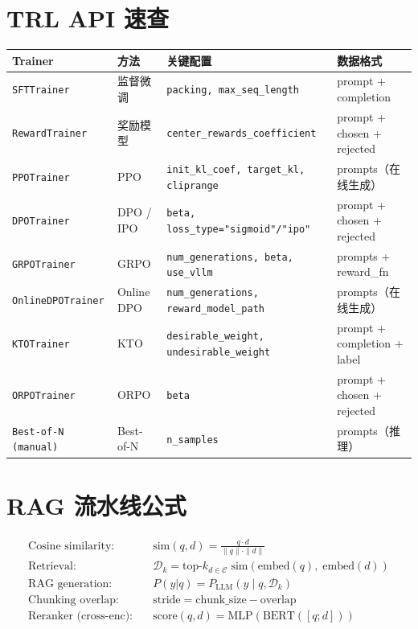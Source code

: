 \section{TRL API 速查}
\label{trl-api-quick-reference}

\noindent\begin{tabularx}{\linewidth}{@{}l Z{0.3} Z{1.58} Z{1.12}@{}}
\toprule
\textbf{Trainer} & \textbf{方法} & \textbf{关键配置} & \textbf{数据格式} \\
\midrule
\texttt{SFTTrainer} & 监督微调 & \texttt{packing, max\_seq\_length} & prompt + completion \\
\texttt{RewardTrainer} & 奖励模型 & \texttt{center\_rewards\_coefficient} & prompt + chosen + rejected \\
\texttt{PPOTrainer} & PPO & \texttt{init\_kl\_coef, target\_kl, cliprange} & prompts（在线生成） \\
\texttt{DPOTrainer} & DPO / IPO & \texttt{beta, loss\_type="sigmoid"/"ipo"} & prompt + chosen + rejected \\
\texttt{GRPOTrainer} & GRPO & \texttt{num\_generations, beta, use\_vllm} & prompts + reward\_fn \\
\texttt{OnlineDPOTrainer} & Online DPO & \texttt{num\_generations, reward\_model\_path} & prompts（在线生成） \\
\texttt{KTOTrainer} & KTO & \texttt{desirable\_weight, undesirable\_weight} & prompt + completion + label \\
\texttt{ORPOTrainer} & ORPO & \texttt{beta} & prompt + chosen + rejected \\
\texttt{Best-of-N (manual)} & Best-of-N & \texttt{n\_samples} & prompts（推理） \\
\bottomrule
\end{tabularx}

\section{RAG 流水线公式}
\label{rag-pipeline-formulas}

\begin{align}
\text{Cosine similarity:}&\quad \text{sim}(q, d) = \frac{q \cdot d}{\|q\| \cdot \|d\|} \\
\text{Retrieval:}&\quad \mathcal{D}_k = \text{top-}k_{d \in \mathcal{C}} \; \text{sim}(\text{embed}(q),\; \text{embed}(d)) \\
\text{RAG generation:}&\quad P(y|q) = P_\text{LLM}(y \;|\; q, \mathcal{D}_k) \\
\text{Chunking overlap:}&\quad \text{stride} = \text{chunk\_size} - \text{overlap} \\
\text{Reranker (cross-enc):}&\quad \text{score}(q, d) = \text{MLP}(\text{BERT}([q; d]))
\end{align}

